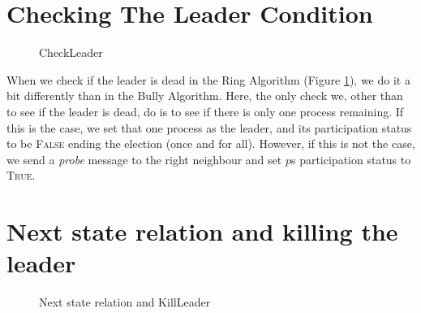 \documentclass{report}
\begin{document}
\section{Checking The Leader Condition}
\begin{figure}
  \tlatex

\@x{}\moduleLeftDash{}\moduleRightDash\@xx{}%
%
%
%
%
%
%
%
%
\@xx{}%
\@x{}\bottombar\@xx{}%

  \caption{CheckLeader}
  \label{ringcheckleader}
  \end{figure}


When we check if the leader is dead in the Ring Algorithm (Figure \ref{ringcheckleader}), we do it a bit differently than in the Bully Algorithm. Here, the only check we, other than to see if the leader is dead, do is to see if there is only one process remaining. If this is the case, we set that one process as the leader, and its participation status to be \textsc{False} ending the election (once and for all). However, if this is not the case, we send a \textit{probe} message to the right neighbour and set $p$s participation status to \textsc{True}.

\section{Next state relation and killing the leader}

\begin{figure}
\tlatex
\@x{}\moduleLeftDash{}\moduleRightDash\@xx{}%
%
%
\@pvspace{8.0pt}%
%
\@x{}\bottombar\@xx{}%

\caption{Next state relation and KillLeader}
\label{ringnextleader}
\end{figure}
\end{document}
